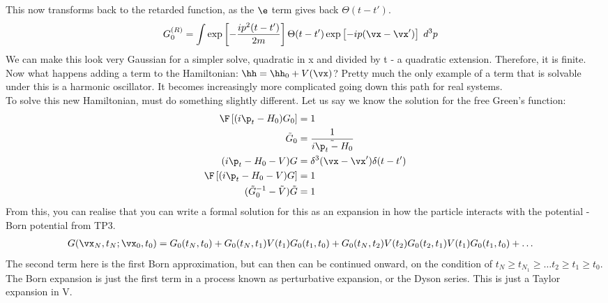 \documentclass[a4paper, 11pt, normalem]{report}
\begin{document}
This now transforms back to the retarded function, as the $\e$ term gives back $\Theta(t-t')$.
\begin{align}
    G^{(R)}_0 &= \int \exp\left[-\frac{ip^2(t-t')}{2m}\right] \Theta(t-t')\exp\left[-ip(\vx-\vx')\right]\; d^3p
\end{align}
We can make this look very Gaussian for a simpler solve, quadratic in x and divided by t - a quadratic extension.
Therefore, it is finite. \\
Now what happens adding a term to the Hamiltonian: $\hh = \hh_0 + V(\vx)$?
Pretty much the only example of a term that is solvable under this is a harmonic oscillator. 
It becomes increasingly more complicated going down this path for real systems.\\
To solve this new Hamiltonian, must do something slightly different. 
Let us say we know the solution for the free Green's function:
\begin{align}
    \F\left[(i\p_t - H_0)G_0\right] &= 1 \\
    \tilde{G}_0 &= \frac{1}{\tilde{i\p_t - H_0}} \\
    (i\p_t - H_0 - V)G &= \delta^3(\vx-\vx')\delta(t-t') \\
    \F\left[(i\p_t-H_0-V)G\right] &= 1 \\
    (\tilde{G}_0^{-1} - \tilde{V})\tilde{G} &= 1
\end{align}
From this, you can realise that you can write a formal solution for this as an expansion in how the particle interacts with the potential - Born potential from TP3. 
\begin{align}
    G(\vx_N,t_N;\vx_0,t_0) &= G_0(t_N,t_0) + G_0(t_N,t_1)V(t_1)G_0(t_1,t_0) + G_0(t_N,t_2)V(t_2)G_0(t_2,t_1)V(t_1)G_0(t_1,t_0) + \dots
\end{align}
The second term here is the first Born approximation, but can then can be continued onward, on the condition of $t_N \geq t_{N_1} \geq \dots t_2\geq t_1\geq t_0$.
The Born expansion is just the first term in a process known as perturbative expansion, or the Dyson series. 
This is just a Taylor expansion in V.
\end{document}
